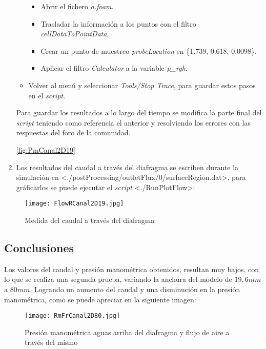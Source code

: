 \begin{enumerate}
\begin{itemize}
    \begin{itemize}
    \item
      Abrir el fichero \emph{a.foam}.
    \item
      Trasladar la información a los puntos con el filtro
      \emph{cellDataToPointData}.
    \item
      Crear un punto de muestreo \emph{probeLocation} en \{1.739, 0.618,
      0.0098\}.
    \item
      Aplicar el filtro \emph{Calculator} a la variable \emph{p\_rgh}.
    \end{itemize}
  \item
    Volver al menú y seleccionar \emph{Tools/Stop Trace}, para guardar
    estos pasos en el \emph{script}.
  \end{itemize}

  Para guardar los resultados a lo largo del tiempo se modifica la parte
  final del \emph{script} teniendo como referencia el anterior y
  resolviendo los errores con las respuestas del foro de la comunidad.

  \autoref{fig:PmCanal2D19}

\item
  Los resultados del caudal a través del diafragma se escriben durante
  la simulación en
  \textless{}./postProcessing/outletFlux/0/surfaceRegion.dat\textgreater{},
  para gráficarlos se puede ejecutar el \emph{script}
  \textless{}./RunPlotFlow\textgreater{}:
\end{enumerate}

\begin{figure}
\centering
\texttt{[image: FlowRCanal2D19.jpg]}
\caption{Medida del caudal a través del diafragma}
\label{fig:FlowRCanal2D19}
\end{figure}

\subsection{Conclusiones}\label{header-n245}

Los valores del caudal y presión manométrica obtenidos, resultan muy
bajos, con lo que se realiza una segunda prueba, variando la anchura del
modelo de \(19,6 mm\) a \(80 mm\). Logrando un aumento del caudal y una
disminución en la presión manométrica, como se puede apreciar en la
siguiente imagen:

\begin{figure}
\centering
\texttt{[image: RmFrCanal2D80.jpg]}
\caption[Presión manométrica y flujo de aire]{Presión manométrica aguas arriba del diafragma y flujo de aire a través del mismo}
\label{fig:RmFrCanal2D80}
\end{figure}

